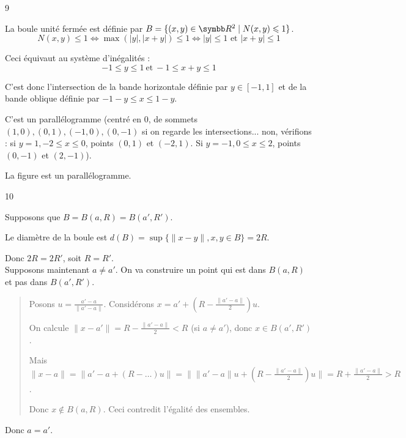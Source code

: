 \begin{correction}{9}

La boule unité fermée est définie par $B = \{ (x,y) \in \R^2 \mid N(x,y) \leqslant 1 \}$.
\[ N(x,y) \leqslant 1 \iff \max(|y|, |x+y|) \leqslant 1 \iff |y| \leqslant 1 \text{ et } |x+y| \leqslant 1 \]

Ceci équivaut au système d'inégalités :
\[ -1 \leqslant y \leqslant 1~\text{et}~-1 \leqslant x+y \leqslant 1 \]

C'est donc l'intersection de la bande horizontale définie par $y \in [-1,1]$
et de la bande oblique définie par $-1-y \le x \le 1-y$.

C'est un parallélogramme (centré en 0, de sommets $(1,0), (0,1), (-1,0), (0,-1)$ si on regarde les intersections... 
non, vérifions : si $y=1, -2 \le x \le 0$, points $(0,1)$ et $(-2,1)$. 
Si $y=-1, 0 \le x \le 2$, points $(0,-1)$ et $(2,-1)$).

La figure est un parallélogramme.
\end{correction}

\begin{correction}{10}

Supposons que $B = B(a,R) = B(a',R')$.

Le diamètre de la boule est $d(B) = \sup \{ \|x-y\|, x,y \in B \} = 2R$.

Donc $2R = 2R'$, soit $R=R'$.\\

Supposons maintenant $a \ne a'$.
On va construire un point qui est dans $B(a,R)$ et pas dans $B(a',R')$.
\begin{quote}
    Posons $u = \frac{a'-a}{\|a'-a\|}$. Considérons $x = a' + \left(R - \frac{\|a'-a\|}{2}\right)u$.
    
    On calcule $\|x-a'\| = R - \frac{\|a'-a\|}{2} < R$ (si $a \ne a'$), donc $x \in B(a',R')$.
    
    Mais $\|x-a\| = \|a' - a + (R - \dots)u\| = \| \|a'-a\|u + (R - \frac{\|a'-a\|}{2})u \| = R + \frac{\|a'-a\|}{2} > R$.
    
    Donc $x \notin B(a,R)$.
    Ceci contredit l'égalité des ensembles. 
\end{quote}
Donc $a=a'$.
\end{correction}
